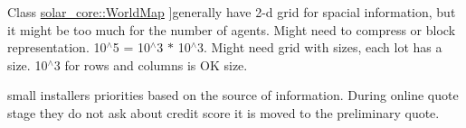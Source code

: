 \begin{DoxyRefList}
Class \hyperlink{classsolar__core_1_1_world_map}{solar\+\_\+core\+:\+:World\+Map} ]generally have 2-\/d grid for spacial information, but it might be too much for the number of agents. Might need to compress or block representation. 10$^\wedge$5 = 10$^\wedge$3 $\ast$ 10$^\wedge$3. Might need grid with sizes, each lot has a size. 10$^\wedge$3 for rows and columns is O\+K size. 
\item[\label{wp__wp000008}%
\hypertarget{wp__wp000008}{}%
Member \hyperlink{classsolar__core_1_1_world_settings_a728f0b1c11f8ec1816d269aedc1cd80e}{solar\+\_\+core\+:\+:World\+Settings\+:\+:params\+\_\+to\+\_\+copy\+\_\+preliminary\+\_\+quote} ]small installers priorities based on the source of information. During online quote stage they do not ask about credit score it is moved to the preliminary quote. 
\end{DoxyRefList}